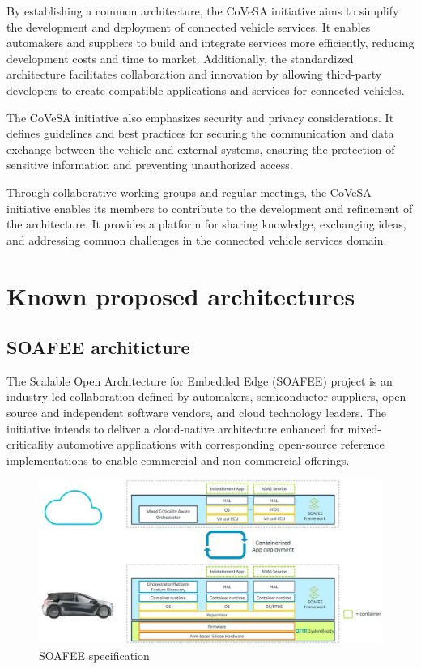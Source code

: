 \documentclass[
12pt,
oneside, 
onehalfspacing, 
nolistspacing, 
parskip, 
chapterinoneline, 
]{AASTCOMPUTER}
\begin{document}
By establishing a common architecture, the CoVeSA initiative aims to simplify the development and deployment of connected vehicle services. It enables automakers and suppliers to build and integrate services more efficiently, reducing development costs and time to market. Additionally, the standardized architecture facilitates collaboration and innovation by allowing third-party developers to create compatible applications and services for connected vehicles.

The CoVeSA initiative also emphasizes security and privacy considerations. It defines guidelines and best practices for securing the communication and data exchange between the vehicle and external systems, ensuring the protection of sensitive information and preventing unauthorized access.

Through collaborative working groups and regular meetings, the CoVeSA initiative enables its members to contribute to the development and refinement of the architecture. It provides a platform for sharing knowledge, exchanging ideas, and addressing common challenges in the connected vehicle services domain.
\newpage
\section{Known proposed architectures}
\subsection{SOAFEE architicture}
The Scalable Open Architecture for Embedded Edge (SOAFEE)\cite{SOAFEE_ARCH} project is an industry-led collaboration defined by automakers, semiconductor suppliers, open source and independent software vendors, and cloud technology leaders. The initiative intends to deliver a cloud-native architecture enhanced for mixed-criticality automotive applications with corresponding open-source reference implementations to enable commercial and non-commercial offerings.

\begin{figure}[!ht]
	\centering
	\includegraphics[scale=1.5]{Figures/Architicture/SOAPHEE.jpg}
  	\caption{SOAFEE specification}
  	\label{fig:SOAFEE specification}
\end{figure}
\end{document}
